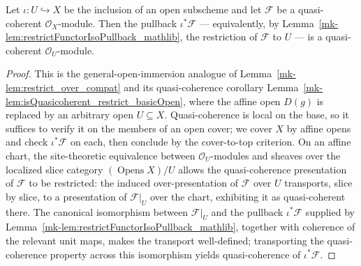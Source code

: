\begin{lemma}
  \label{mk-lem:isQuasicoherent_pullback_opens}

  Let \(\iota : U \hookrightarrow X\) be the inclusion of an open subscheme and let
  \(\mathcal{F}\) be a quasi-coherent \(\mathcal{O}_X\)-module. Then the pullback
  \(\iota^*\mathcal{F}\) --- equivalently, by
  Lemma~\ref{mk-lem:restrictFunctorIsoPullback_mathlib}, the restriction of \(\mathcal{F}\)
  to \(U\) --- is a quasi-coherent \(\mathcal{O}_U\)-module.
\end{lemma}
\begin{proof}
  This is the general-open-immersion analogue of Lemma~\ref{mk-lem:restrict_over_compat}
  and its quasi-coherence corollary Lemma~\ref{mk-lem:isQuasicoherent_restrict_basicOpen},
  where the affine open \(D(g)\) is replaced by an arbitrary open \(U \subseteq X\).
  Quasi-coherence is local on the base, so it suffices to verify it on the members of
  an open cover; we cover \(X\) by affine opens and check \(\iota^*\mathcal{F}\) on
  each, then conclude by the cover-to-top criterion. On an affine chart, the
  site-theoretic equivalence between \(\mathcal{O}_U\)-modules and sheaves over the
  localized slice category \((\operatorname{Opens} X)/U\) allows the quasi-coherence
  presentation of \(\mathcal{F}\) to be restricted: the induced over-presentation of
  \(\mathcal{F}\) over \(U\) transports, slice by slice, to a presentation of
  \(\mathcal{F}|_U\) over the chart, exhibiting it as quasi-coherent there. The
  canonical isomorphism between \(\mathcal{F}|_U\) and the pullback
  \(\iota^*\mathcal{F}\) supplied by
  Lemma~\ref{mk-lem:restrictFunctorIsoPullback_mathlib}, together with coherence of the
  relevant unit maps, makes the transport well-defined; transporting the
  quasi-coherence property across this isomorphism yields quasi-coherence of
  \(\iota^*\mathcal{F}\).
\end{proof}

